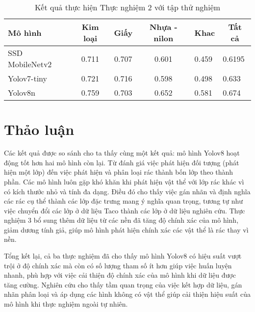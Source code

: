 \documentclass[../the.tex]{subfiles}
\begin{document}
\begin{table}[h!]
    \centering
    \caption{Kết quả thực hiện Thực nghiệm 2 với tập thử nghiệm}
    \begin{tabular}{|l|c|c|c|l|l|}
        \hline
        \textbf{Mô hình}  & \textbf{Kim loại}          & \textbf{Giấy}              & \textbf{Nhựa - nilon}      & \multicolumn{1}{c|}{\textbf{Khac}} & \multicolumn{1}{c|}{\textbf{Tất cả}} \\ \hline
        SSD   MobileNetv2 & 0.711                      & 0.707                      & 0.601                      & 0.459                              & 0.6195                               \\ \hline
        Yolov7-tiny       & 0.721                      & 0.716                      & 0.598                      & 0.498                              & 0.633                                \\ \hline
        Yolov8n           & 0.759                      & 0.703                      & 0.652                      & 0.581                              & 0.674                                \\ \hline
    \end{tabular}
    \label{tab:thucnghiem2.2}
\end{table}

\section{Thảo luận} 
{\fontsize{13}{12} \selectfont 
Các kết quả được so sánh cho ta thấy cùng một kết quả: mô hình Yolov8 hoạt động tốt hơn hai mô hình còn lại.
Từ đánh giá việc phát hiện đối tượng (phát hiện một lớp) đến việc phát hiện và phân loại rác thành bốn lớp theo thành phần.
Các mô hình luôn gặp khó khăn khi phát hiện vật thể với lớp rác khác vì có kích thước nhỏ và tính đa dạng. 
Điều đó cho thấy việc gán nhãn và định nghĩa các rác cụ thể thành các lớp đặc trưng mang ý nghĩa quan trọng,
tương tự như việc chuyển đổi các lớp ở dữ liệu Taco thành các lớp ở dữ liệu nghiên cứu. 
Thực nghiệm 3 bổ sung thêm dữ liệu từ các nền đã tăng độ chính xác của mô hình, giảm dương tính giả, giúp mô hình phát hiện chính xác các vật thể là rác thay vì nền.
}

\bigskip

{\fontsize{13}{12} \selectfont 
Tổng kết lại, cả ba thực nghiệm đã cho thấy mô hình Yolov8 có hiệu suất vượt trội ở độ chính xác 
mà còn có số lượng tham số ít hơn giúp việc huấn luyện nhanh, phù hợp với việc cải thiện độ chính xác của mô hình khi dữ liệu được tăng cường.
Nghiên cứu cho thấy tầm quan trọng của việc kết hợp dữ liệu, gán nhãn phân loại và áp dụng các hình không có vật thể giúp cải thiện hiệu suất của mô hình khi thực nghiệm ngoài tự nhiên.

}
\end{document}
